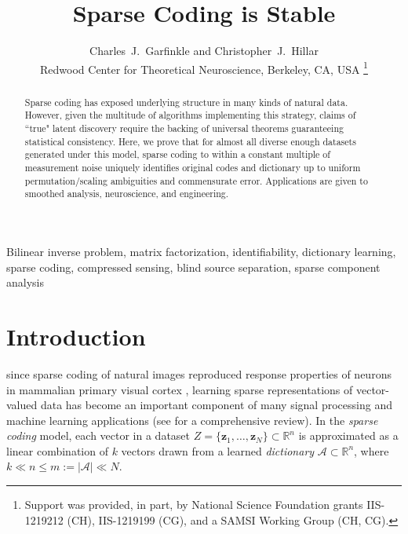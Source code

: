 \documentclass[journal, twocolumn]{IEEEtran}
\begin{document}
\title{Sparse Coding is Stable}

\author{Charles~J.~Garfinkle and Christopher~J.~Hillar \\
Redwood Center for Theoretical Neuroscience, Berkeley, CA, USA
\thanks{%
Support was provided, in part, by National Science Foundation grants IIS-1219212 (CH), IIS-1219199 (CG), and a SAMSI Working Group (CH, CG).}}


\maketitle

\begin{abstract}
Sparse coding has exposed underlying structure in many kinds of natural data.  However, given the multitude of algorithms implementing this strategy, claims of ``true" latent discovery require the backing of universal theorems guaranteeing statistical consistency.  Here, we prove that for almost all diverse enough datasets generated under this model, sparse coding to within a constant multiple of measurement noise uniquely identifies original codes and dictionary up to uniform permutation/scaling ambiguities and commensurate error.  Applications are given to smoothed analysis, neuroscience, and engineering.
\end{abstract}

\begin{IEEEkeywords}
Bilinear inverse problem, matrix factorization, identifiability, dictionary learning, sparse coding, compressed sensing, blind source separation, sparse component analysis
\end{IEEEkeywords}


\section{Introduction}
 since sparse coding of natural images reproduced response properties of neurons in mammalian primary visual cortex \cite{Olshausen96}, learning sparse representations of vector-valued data has become an important component of many signal processing and machine learning applications (see \cite{Zhang15} for a comprehensive review). In the \textit{sparse coding} model, each vector in a dataset $Z = \{\mathbf{z}_1, \ldots, \mathbf{z}_N\} \subset \mathbb{R}^n$ is approximated as a linear combination of $k$ vectors drawn from a learned \emph{dictionary} $\mathcal{A} \subset \mathbb{R}^n$, where $k \ll n \leq m:= |\mathcal{A}| \ll N$. 
\end{document}
